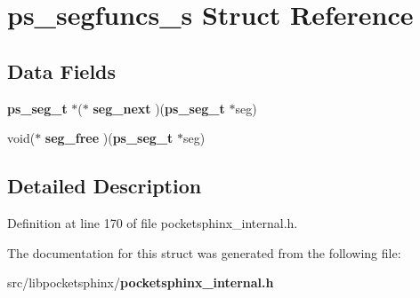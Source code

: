 \section{ps\+\_\+segfuncs\+\_\+s Struct Reference}
\label{structps__segfuncs__s}
\subsection*{Data Fields}
\begin{DoxyCompactItemize}
\item 
{\bf ps\+\_\+seg\+\_\+t} $\ast$($\ast$ {\bfseries seg\+\_\+next} )({\bf ps\+\_\+seg\+\_\+t} $\ast$seg)\label{structps__segfuncs__s_a880757cdcfb8c858dfa82d44259fc8f9}

\item 
void($\ast$ {\bfseries seg\+\_\+free} )({\bf ps\+\_\+seg\+\_\+t} $\ast$seg)\label{structps__segfuncs__s_aefbd109d77bf6556b352e5fab721858e}

\end{DoxyCompactItemize}


\subsection{Detailed Description}


Definition at line 170 of file pocketsphinx\+\_\+internal.\+h.



The documentation for this struct was generated from the following file\+:\begin{DoxyCompactItemize}
\item 
src/libpocketsphinx/{\bf pocketsphinx\+\_\+internal.\+h}\end{DoxyCompactItemize}
